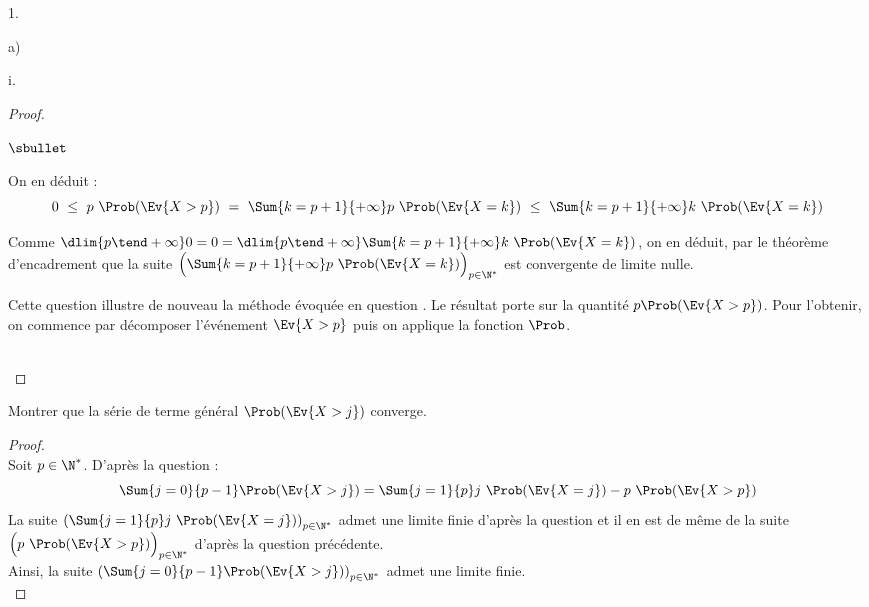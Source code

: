 \begin{noliste}{1.}
\begin{noliste}{a)}
\begin{nonoliste}{i.}
\begin{proof}
\begin{noliste}{$\sbullet$}
        \item On en déduit :
          \[
          0 \ \leq \ p \ \Prob(\Ev{X > p}) \ = \ \Sum{k =
            p+1}{+\infty} p \ \Prob(\Ev{X = k}) \ \leq \ \Sum{k =
            p+1}{+\infty} k \ \Prob(\Ev{X = k})
          \]

        \item Comme $\dlim{p \tend +\infty} 0 = 0 = \dlim{p \tend
            +\infty} \Sum{k = p+1}{+\infty} k \ \Prob(\Ev{X = k})$, on
          en déduit, par le théorème d'encadrement que la suite
          $\Big(\Sum{k = p+1}{+\infty} p \ \Prob(\Ev{X = k}) \Big)_{p
            \in \N^*}$ est convergente de limite nulle.
        \end{noliste}
        \begin{remark}%
          Cette question illustre de nouveau la méthode évoquée en
          question . Le résultat porte sur la quantité $p
          \Prob(\Ev{X > p})$. Pour l'obtenir, on commence par
          décomposer l'événement $\Ev{X > p}$ puis on applique la
          fonction $\Prob$.
        \end{remark}~\\[-1.2cm]
      \end{proof}

    \item Montrer que la série de terme général $\Prob(\Ev{X>j})$
      converge.

      \begin{proof}~\\
        Soit $p \in \N^*$. D'après la question  :
        \[
        \Sum{j=0}{p-1} \Prob(\Ev{X > j}) = \Sum{j=1}{p} j \ \Prob(\Ev{X
          = j}) - p \ \Prob(\Ev{X > p})
        \]
        La suite $\left( \Sum{j=1}{p} j \ \Prob(\Ev{X = j}) \right)_{p
          \in \N^*}$ admet une limite finie d'après la question
         et il en est de même de la suite $\Big( p \
        \Prob(\Ev{X > p}) \Big)_{p \in \N^*}$ d'après la question
        précédente. \\ %
        Ainsi, la suite $\left( \Sum{j=0}{p-1} \Prob(\Ev{X > j})
        \right)_{p \in \N^*}$ admet une limite finie.%
        ~\\[-1cm]
    \end{proof}



\end{nonoliste}
\end{noliste}
\end{noliste}
